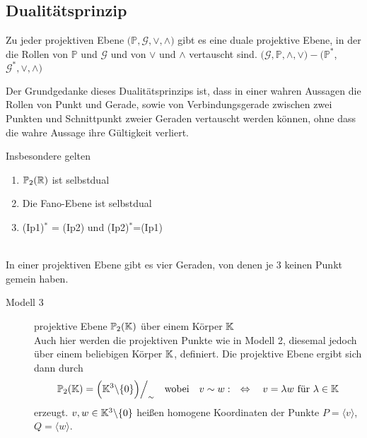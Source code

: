 \subsection*{Dualitätsprinzip}

  Zu jeder projektiven Ebene $\big( \mathbb{P}, \mathcal{G}, \vee, \wedge \big)$ gibt es eine duale projektive Ebene, in
  der die Rollen von $\mathbb{P}$ und $\mathcal{G}$ und von $\vee$ und $\wedge$ vertauscht sind.
  $\big( \mathcal{G}, \mathbb{P}, \wedge, \vee \big) - \big( \mathbb{P}^*$, $ \mathcal{G}^*, \vee, \wedge \big)$

  Der Grundgedanke dieses Dualitätsprinzips ist, dass in einer wahren Aussagen die Rollen von Punkt und Gerade, sowie von
  Verbindungsgerade zwischen zwei Punkten und Schnittpunkt zweier Geraden vertauscht werden können, ohne dass die wahre
  Aussage ihre Gültigkeit verliert.

  \begin{bem} Insbesondere gelten
    \begin{enumerate}
      \item $\mathbb{P}_2(\mathbb R)$ ist selbstdual
      \item Die Fano-Ebene ist selbstdual
      \item (Ip1)$^*$ = (Ip2) und (Ip2)$^*$=(Ip1)
    \end{enumerate}
  \end{bem}

  \begin{thm} \ \\
    In einer projektiven Ebene gibt es vier Geraden, von denen je $3$ keinen Punkt gemein haben.
  \end{thm}

  \begin{description}
      \item[Modell 3] projektive Ebene $\mathbb{P}_2(\mathbb K)$ über einem Körper $\mathbb K$ \\
          Auch hier werden die projektiven Punkte wie in Modell 2, diesemal jedoch über einem beliebigen Körper $\mathbb K$, definiert.
          Die projektive Ebene ergibt sich dann durch
          \begin{align*}
            \mathbb{P}_2(\mathbb K) = \Big( \mathbb K^3\backslash \{0\}\Big) \Big/_\sim \quad
            \mbox{wobei} \quad v \sim w : \quad \Leftrightarrow \quad v=\lambda w
            \mbox{ für } \lambda \in \mathbb K
          \end{align*}
          erzeugt. $v,w \in \mathbb K^3\backslash\{0\}$ heißen homogene Koordinaten der Punkte $P=\langle v \rangle$, $Q=\langle w \rangle$.
  \end{description}

